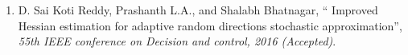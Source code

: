 \begin{enumerate}
\item D. Sai Koti Reddy, Prashanth L.A., and Shalabh Bhatnagar,
 `` Improved Hessian estimation for adaptive random directions stochastic approximation'', {\em 55th IEEE conference on Decision and control, 2016 (Accepted)}.  \\ \\
\end{enumerate}
